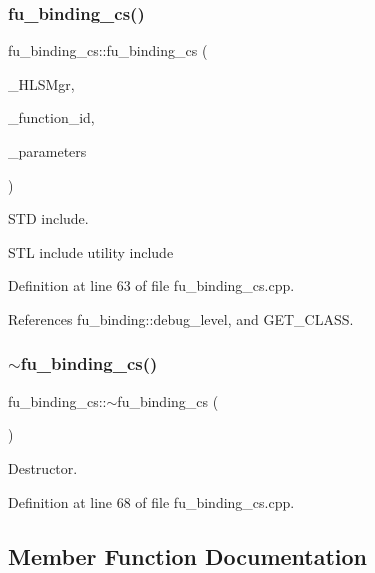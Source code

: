 \subsubsection{\texorpdfstring{fu\+\_\+binding\+\_\+cs()}{fu\_binding\_cs()}}
{\footnotesize\ttfamily fu\+\_\+binding\+\_\+cs\+::fu\+\_\+binding\+\_\+cs (\begin{DoxyParamCaption}\item[{const \hyperlink{hls__manager_8hpp_a1b481383e3beabc89bd7562ae672dd8c}{H\+L\+S\+\_\+manager\+Const\+Ref}}]{\+\_\+\+H\+L\+S\+Mgr,  }\item[{const unsigned int}]{\+\_\+function\+\_\+id,  }\item[{const \hyperlink{Parameter_8hpp_a37841774a6fcb479b597fdf8955eb4ea}{Parameter\+Const\+Ref}}]{\+\_\+parameters }\end{DoxyParamCaption})}



S\+TD include. 

S\+TL include utility include 

Definition at line 63 of file fu\+\_\+binding\+\_\+cs.\+cpp.



References fu\+\_\+binding\+::debug\+\_\+level, and G\+E\+T\+\_\+\+C\+L\+A\+SS.

\mbox{\label{classfu__binding__cs_ae02202ffc124e2e628be4771b20e6a3f}} 
\subsubsection{\texorpdfstring{$\sim$fu\+\_\+binding\+\_\+cs()}{~fu\_binding\_cs()}}
{\footnotesize\ttfamily fu\+\_\+binding\+\_\+cs\+::$\sim$fu\+\_\+binding\+\_\+cs (\begin{DoxyParamCaption}{ }\end{DoxyParamCaption})\hspace{0.3cm}{\ttfamily [virtual]}}



Destructor. 



Definition at line 68 of file fu\+\_\+binding\+\_\+cs.\+cpp.



\subsection{Member Function Documentation}
\mbox{\label{classfu__binding__cs_a60affd4760275bc386a0bdc05400dc6b}} 
